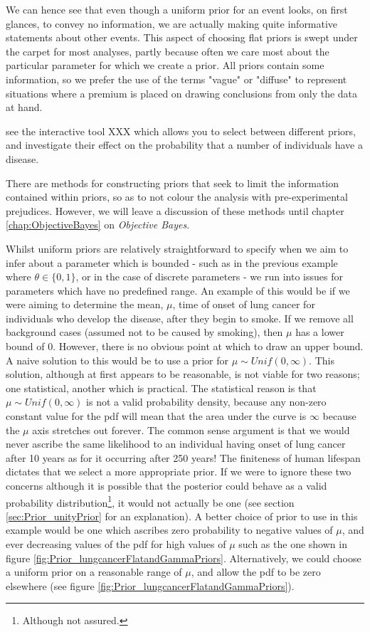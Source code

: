 \documentclass[11pt,fullpage]{book}
\begin{document}
We can hence see that even though a uniform prior for an event looks, on first glances, to convey no information, we are actually making quite informative statements about other events. This aspect of choosing flat priors is swept under the carpet for most analyses, partly because often we care most about the particular parameter for which we create a prior. All priors contain some information, so we prefer the use of the terms "vague" or "diffuse" to represent situations where a premium is placed on drawing conclusions from only the data at hand.

 see the interactive tool XXX which allows you to select between different priors, and investigate their effect on the probability that a number of individuals have a disease.

There are methods for constructing priors that seek to limit the information contained within priors, so as to not colour the analysis with pre-experimental prejudices. However, we will leave a discussion of these methods until chapter \ref{chap:ObjectiveBayes} on \textit{Objective Bayes}.

Whilst uniform priors are relatively straightforward to specify when we aim to infer about a parameter which is bounded - such as in the previous example where $\theta\in\{0,1\}$, or in the case of discrete parameters - we run into issues for parameters which have no predefined range. An example of this would be if we were aiming to determine the mean, $\mu$, time of onset of lung cancer for individuals who develop the disease, after they begin to smoke. If we remove all background cases (assumed not to be caused by smoking), then $\mu$ has a lower bound of 0. However, there is no obvious point at which to draw an upper bound. A naive solution to this would be to use a prior for $\mu\sim Unif(0,\infty)$. This solution, although at first appears to be reasonable, is not viable for two reasons; one statistical, another which is practical. The statistical reason is that $\mu\sim Unif(0,\infty)$ is not a valid probability density, because any non-zero constant value for the pdf will mean that the area under the curve is $\infty$ because the $\mu$ axis stretches out forever. The common sense argument is that we would never ascribe the same likelihood to an individual having onset of lung cancer after 10 years as for it occurring after 250 years! The finiteness of human lifespan dictates that we select a more appropriate prior. If we were to ignore these two concerns although it is possible that the posterior could behave as a valid probability distribution\footnote{Although not assured.}, it would not actually be one (see section \ref{sec:Prior_unityPrior} for an explanation). A better choice of prior to use in this example would be one which ascribes zero probability to negative values of $\mu$, and ever decreasing values of the pdf for high values of $\mu$ such as the one shown in figure \ref{fig:Prior_lungcancerFlatandGammaPriors}. Alternatively, we could choose a uniform prior on a reasonable range of $\mu$, and allow the pdf to be zero elsewhere (see figure \ref{fig:Prior_lungcancerFlatandGammaPriors}).
\end{document}
